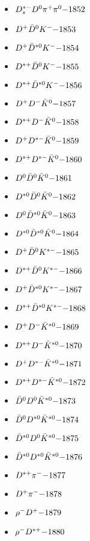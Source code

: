 \begin{multicols}{3}
\begin{itemize}
 \item $ D_{s}^{*-} D^{0} \pi^{+} \pi^{0} \hfill{-1852}$
 \item $ D^{+} \bar{D}^{0} K^{-} \hfill{-1853}$
 \item $ D^{+} \bar{D}^{*0} K^{-} \hfill{-1854}$
 \item $ D^{*+} \bar{D}^{0} K^{-} \hfill{-1855}$
 \item $ D^{*+} \bar{D}^{*0} K^{-} \hfill{-1856}$
 \item $ D^{+} D^{-} \bar{K}^{0} \hfill{-1857}$
 \item $ D^{*+} D^{-} \bar{K}^{0} \hfill{-1858}$
 \item $ D^{+} D^{*-} \bar{K}^{0} \hfill{-1859}$
 \item $ D^{*+} D^{*-} \bar{K}^{0} \hfill{-1860}$
 \item $ D^{0} \bar{D}^{0} \bar{K}^{0} \hfill{-1861}$
 \item $ D^{*0} \bar{D}^{0} \bar{K}^{0} \hfill{-1862}$
 \item $ D^{0} \bar{D}^{*0} \bar{K}^{0} \hfill{-1863}$
 \item $ D^{*0} \bar{D}^{*0} \bar{K}^{0} \hfill{-1864}$
 \item $ D^{+} \bar{D}^{0} K^{*-} \hfill{-1865}$
 \item $ D^{*+} \bar{D}^{0} K^{*-} \hfill{-1866}$
 \item $ D^{+} \bar{D}^{*0} K^{*-} \hfill{-1867}$
 \item $ D^{*+} \bar{D}^{*0} K^{*-} \hfill{-1868}$
 \item $ D^{+} D^{-} \bar{K}^{*0} \hfill{-1869}$
 \item $ D^{*+} D^{-} \bar{K}^{*0} \hfill{-1870}$
 \item $ D^{+} D^{*-} \bar{K}^{*0} \hfill{-1871}$
 \item $ D^{*+} D^{*-} \bar{K}^{*0} \hfill{-1872}$
 \item $ \bar{D}^{0} D^{0} \bar{K}^{*0} \hfill{-1873}$
 \item $ \bar{D}^{0} D^{*0} \bar{K}^{*0} \hfill{-1874}$
 \item $ \bar{D}^{*0} D^{0} \bar{K}^{*0} \hfill{-1875}$
 \item $ \bar{D}^{*0} D^{*0} \bar{K}^{*0} \hfill{-1876}$
 \item $ D^{*+} \pi^{-} \hfill{-1877}$
 \item $ D^{+} \pi^{-} \hfill{-1878}$
 \item $ \rho^{-} D^{+} \hfill{-1879}$
 \item $ \rho^{-} D^{*+} \hfill{-1880}$

\end{itemize}
\end{multicols}

